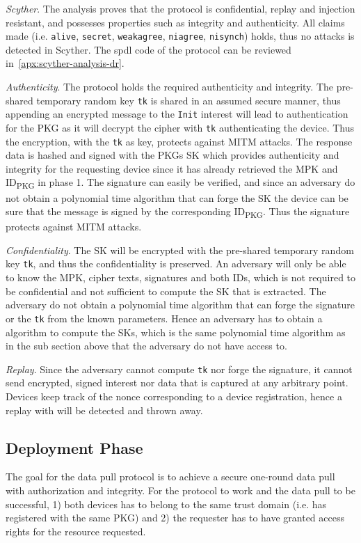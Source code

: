 \textit{Scyther}.
The analysis proves that the protocol is confidential, replay and injection resistant, and possesses properties such as integrity and authenticity.
All claims made (i.e. \texttt{alive}, \texttt{secret}, \texttt{weakagree}, \texttt{niagree}, \texttt{nisynch}) holds, thus no attacks is detected in Scyther.
The \gls{spdl} code of the protocol can be reviewed in~\autoref{apx:scyther-analysis-dr}.

\textit{Authenticity}.
The protocol holds the required authenticity and integrity. 
The pre-shared temporary random key \texttt{tk} is shared in an assumed secure manner, thus appending an encrypted message to the \texttt{Init} \gls{interest} will lead to authentication for the \gls{PKG} as it will decrypt the cipher with \texttt{tk} authenticating the device.
Thus the encryption, with the \texttt{tk} as key, protects against \gls{MITM} attacks.
The response \gls{data} is hashed and signed with the \gls{PKG}s \gls{SK} which provides authenticity and integrity for the requesting device since it has already retrieved the \gls{MPK} and ID\textsubscript{PKG} in phase 1.
The signature can easily be verified, and since an adversary do not obtain a polynomial time algorithm that can forge the \gls{SK} the device can be sure that the message is signed by the corresponding ID\textsubscript{PKG}.
Thus the signature protects against \gls{MITM} attacks.

\textit{Confidentiality}. 
The \gls{SK} will be encrypted with the pre-shared temporary random key \texttt{tk}, and thus the confidentiality is preserved.
An adversary will only be able to know the \gls{MPK}, cipher texts, signatures and both IDs, which is not required to be confidential and not sufficient to compute the \gls{SK} that is extracted. 
The adversary do not obtain a polynomial time algorithm that can forge the signature or the \texttt{tk} from the known parameters.
Hence an adversary has to obtain a algorithm to compute the \gls{SK}s, which is the same polynomial time algorithm as in the sub section above that the adversary do not have access to.

\textit{Replay}.
Since the adversary cannot compute \texttt{tk} nor forge the signature, it cannot send encrypted, signed \gls{interest} nor \gls{data} that is captured at any arbitrary point. 
Devices keep track of the nonce corresponding to a device registration, hence a replay with will be detected and thrown away.

\subsection{Deployment Phase}\label{data_pull}
The goal for the data pull protocol is to achieve a secure one-round data pull with authorization and integrity.
For the protocol to work and the data pull to be successful, 1) both devices has to belong to the same trust domain (i.e. has registered with the same \gls{PKG}) and 2) the requester has to have granted access rights for the resource requested.


